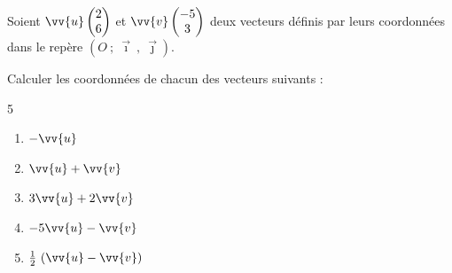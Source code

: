 \documentclass[main.tex]{subfiles}
\begin{document}
\begin{exercise}\hfill 

\noindent Soient $\vv{u}\begin{pmatrix}
2\\6
\end{pmatrix}$ et $\vv{v}\begin{pmatrix}
-5\\ 3
\end{pmatrix}$ deux vecteurs définis par leurs coordonnées dans le repère
$(O~;~ \vec{\imath}~,~ \vec{\jmath})$.

\noindent  Calculer les coordonnées de chacun des vecteurs suivants :
\begin{multicols}{5}
\begin{enumerate}[label=\alph*),leftmargin=*]
\item $-\vv{u}$
\item $\vv{u}+\vv{v}$
\item $3\vv{u}+2\vv{v}$
\item  $-5\vv{u}-\vv{v}$
\item $\tfrac{1}{2}~(\vv{u}- \vv{v})$
\end{enumerate}
\end{multicols}
\end{exercise}
\end{document}
